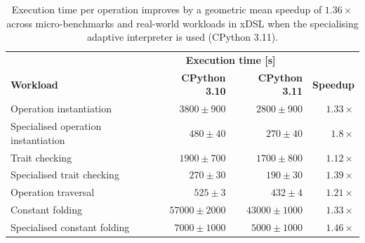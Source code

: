 \begin{table}[H]
  \caption{Execution time per operation improves by a geometric mean speedup of $1.36\times$ across micro-benchmarks and real-world workloads in xDSL when the specialising adaptive interpreter is used (CPython 3.11).}
  \label{tab:specialising-adaptive-interpreter-xdsl}
  \centering
  \begin{tabular}{lrrr}
    \toprule
    & \multicolumn{2}{c}{\textbf{Execution time [s]}} \\
    \cmidrule(r){2-3}
    \textbf{Workload}& \textbf{CPython 3.10} & \textbf{CPython 3.11} & \textbf{Speedup} \\
    \midrule
    Operation instantiation & $3800 \pm 900$ & $2800 \pm 900$ & $1.33\times$ \\
    Specialised operation instantiation & $480 \pm 40$ & $270 \pm 40$ & $1.8\times$ \\
    Trait checking & $1900 \pm 700$ & $1700 \pm 800$ & $1.12\times$ \\
    Specialised trait checking & $270 \pm 30$ & $190 \pm 30$ & $1.39\times$ \\
    Operation traversal & $525 \pm 3$ & $432 \pm 4$ & $1.21\times$ \\
    Constant folding & $57000 \pm 2000$ & $43000 \pm 1000$ & $1.33\times$ \\
    Specialised constant folding & $7000 \pm 1000$ & $5000 \pm 1000$ & $1.46\times$ \\
    \bottomrule
  \end{tabular}
\end{table}


